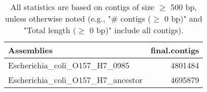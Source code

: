 \documentclass[12pt,a4paper]{article}
\begin{document}
\begin{table}[ht]
\begin{center}
\caption{All statistics are based on contigs of size $\geq$ 500 bp, unless otherwise noted (e.g., "\# contigs ($\geq$ 0 bp)" and "Total length ($\geq$ 0 bp)" include all contigs).}
\begin{tabular}{|l*{1}{|r}|}
\hline
Assemblies & final.contigs \\ \hline
Escherichia\_coli\_O157\_H7\_0985 & 4801484 \\ \hline
Escherichia\_coli\_O157\_H7\_ancestor & 4695879 \\ \hline
\end{tabular}
\end{center}
\end{table}
\end{document}
